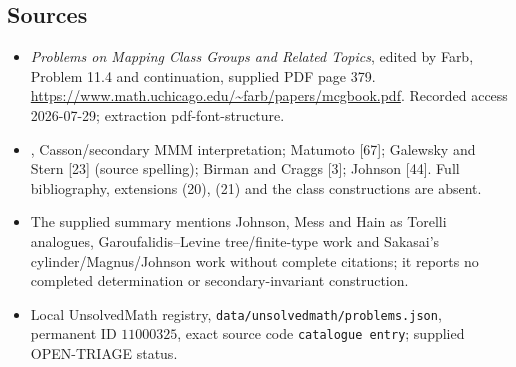 \documentclass[11pt]{article}
\begin{document}
\subsection{Sources}
\begin{itemize}
\item \emph{Problems on Mapping Class Groups and Related Topics}, edited by Farb, Problem 11.4 and continuation, supplied PDF page 379. \url{https://www.math.uchicago.edu/~farb/papers/mcgbook.pdf}. Recorded access 2026-07-29; extraction pdf-font-structure.
\item [74], Casson/secondary MMM interpretation; Matumoto [67]; Galewsky and Stern [23] (source spelling); Birman and Craggs [3]; Johnson [44]. Full bibliography, extensions (20), (21) and the class constructions are absent.
\item The supplied summary mentions Johnson, Mess and Hain as Torelli analogues, Garoufalidis--Levine tree/finite-type work and Sakasai's cylinder/Magnus/Johnson work without complete citations; it reports no completed determination or secondary-invariant construction.
\item Local UnsolvedMath registry, \texttt{data/unsolvedmath/problems.json}, permanent ID \(11000325\), exact source code \texttt{catalogue entry}; supplied OPEN-TRIAGE status.
\end{itemize}
\end{document}
